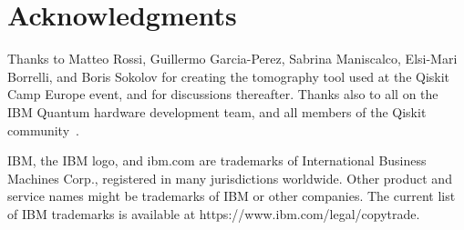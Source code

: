 \documentclass[conference]{IEEEtran}
\begin{document}
\section*{Acknowledgments}

Thanks to Matteo Rossi, Guillermo Garcia-Perez, Sabrina Maniscalco, Elsi-Mari Borrelli, and Boris Sokolov for creating the tomography tool used at the Qiskit Camp Europe event, and for discussions thereafter. Thanks also to all on the IBM Quantum hardware development team, and all members of the Qiskit community~\cite{qiskit}.

IBM, the IBM logo, and ibm.com are trademarks of International Business Machines Corp., registered in many jurisdictions worldwide. Other product and service names might be trademarks of IBM or other companies. The current list of IBM trademarks is available at https://www.ibm.com/legal/copytrade.




\end{document}

